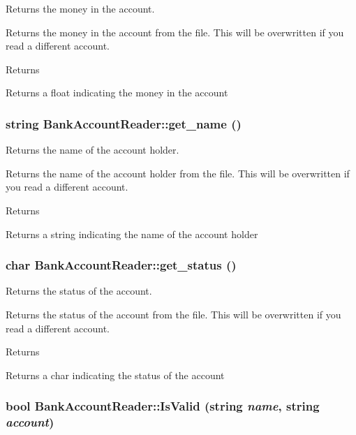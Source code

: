 Returns the money in the account. 

Returns the money in the account from the file. This will be overwritten if you read a different account.

\begin{DoxyReturn}{Returns}

\end{DoxyReturn}
Returns a float indicating the money in the account \hypertarget{classBankAccountReader_a40a0346c2fb73db498db89aa74b9fa84}{
\subsubsection[{get\_\-name}]{\setlength{\rightskip}{0pt plus 5cm}string BankAccountReader::get\_\-name ()}}
\label{classBankAccountReader_a40a0346c2fb73db498db89aa74b9fa84}


Returns the name of the account holder. 

Returns the name of the account holder from the file. This will be overwritten if you read a different account.

\begin{DoxyReturn}{Returns}

\end{DoxyReturn}
Returns a string indicating the name of the account holder \hypertarget{classBankAccountReader_af1fd3ec664775df5d5ca4ea2c233a263}{
\subsubsection[{get\_\-status}]{\setlength{\rightskip}{0pt plus 5cm}char BankAccountReader::get\_\-status ()}}
\label{classBankAccountReader_af1fd3ec664775df5d5ca4ea2c233a263}


Returns the status of the account. 

Returns the status of the account from the file. This will be overwritten if you read a different account.

\begin{DoxyReturn}{Returns}

\end{DoxyReturn}
Returns a char indicating the status of the account \hypertarget{classBankAccountReader_ae12dd7be7d621c62b892526d78afd564}{
\subsubsection[{IsValid}]{\setlength{\rightskip}{0pt plus 5cm}bool BankAccountReader::IsValid (string {\em name}, \/  string {\em account})}}
\label{classBankAccountReader_ae12dd7be7d621c62b892526d78afd564}


